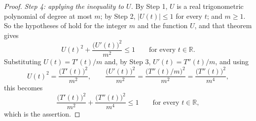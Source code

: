 \begin{proof}
\emph{Step 4: applying the inequality to $U$.} By Step 1, $U$ is a real
trigonometric polynomial of degree at most $m$; by Step 2,
$\lvert U(t)\rvert\le1$ for every $t$; and $m\ge1$. So the hypotheses of
 hold for the integer $m$ and the function $U$, and that
theorem gives
\[
  U(t)^2+\frac{\bigl(U'(t)\bigr)^2}{m^2}\le1
  \qquad\text{for every }t\in\mathbb{R}.
\]
Substituting $U(t)=T'(t)/m$ and, by Step 3, $U'(t)=T''(t)/m$, and using
\[
  U(t)^2=\frac{\bigl(T'(t)\bigr)^2}{m^2},
  \qquad
  \frac{\bigl(U'(t)\bigr)^2}{m^2}
   =\frac{\bigl(T''(t)/m\bigr)^2}{m^2}
   =\frac{\bigl(T''(t)\bigr)^2}{m^4},
\]
this becomes
\[
  \frac{\bigl(T'(t)\bigr)^2}{m^2}+\frac{\bigl(T''(t)\bigr)^2}{m^4}\le1
  \qquad\text{for every }t\in\mathbb{R},
\]
which is the assertion.
\end{proof}

